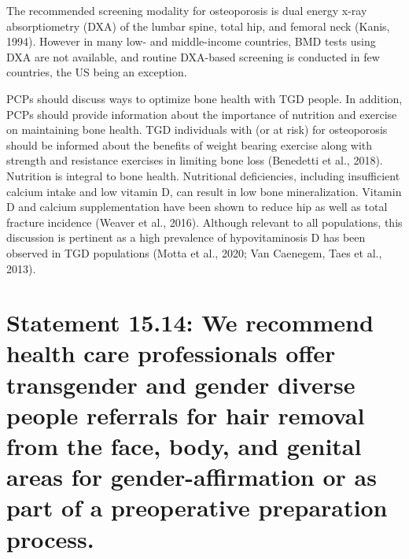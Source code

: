 \documentclass[
]{book}
\begin{document}
The recommended screening modality for osteoporosis is dual energy x-ray absorptiometry
(DXA) of the lumbar spine, total hip, and femoral
neck (Kanis, 1994). However in many low- and
middle-income countries, BMD tests using DXA
are not available, and routine DXA-based screening is conducted in few countries, the US being
an exception.

PCPs should discuss ways to optimize bone
health with TGD people. In addition, PCPs
should provide information about the importance
of nutrition and exercise on maintaining bone
health. TGD individuals with (or at risk) for osteoporosis should be informed about the benefits
of weight bearing exercise along with strength
and resistance exercises in limiting bone loss
(Benedetti et al., 2018). Nutrition is integral to
bone health. Nutritional deficiencies, including
insufficient calcium intake and low vitamin D,
can result in low bone mineralization. Vitamin
D and calcium supplementation have been shown
to reduce hip as well as total fracture incidence
(Weaver et al., 2016). Although relevant to all
populations, this discussion is pertinent as a high
prevalence of hypovitaminosis D has been
observed in TGD populations (Motta et al., 2020;
Van Caenegem, Taes et al., 2013).

\hypertarget{statement-15.14-we-recommend-health-care-professionals-offer-transgender-and-gender-diverse-people-referrals-for-hair-removal-from-the-face-body-and-genital-areas-for-gender-affirmation-or-as-part-of-a-preoperative-preparation-process.}{%
\section*{Statement 15.14: We recommend health care professionals offer transgender and gender diverse people referrals for hair removal from the face, body, and genital areas for gender-affirmation or as part of a preoperative preparation process.}\label{statement-15.14-we-recommend-health-care-professionals-offer-transgender-and-gender-diverse-people-referrals-for-hair-removal-from-the-face-body-and-genital-areas-for-gender-affirmation-or-as-part-of-a-preoperative-preparation-process.}}
\end{document}
